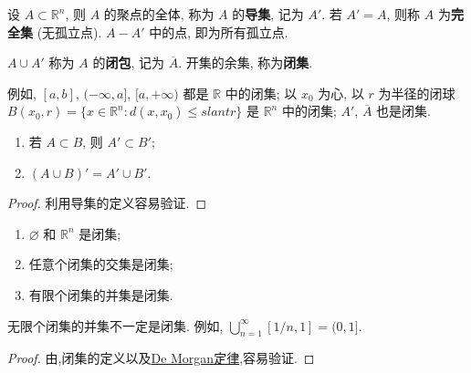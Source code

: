 \documentclass[../../main.tex]{subfiles}
\begin{document}
\begin{definition}
设 $A \subset \mathbb{R}^n$, 则 $A$ 的聚点的全体, 称为 $A$ 的\textbf{导集}, 记为 $A'$. 若 $A' = A$, 则称 $A$ 为\textbf{完全集} (无孤立点).
$A - A'$ 中的点, 即为所有孤立点.

$A \cup A'$ 称为 $A$ 的\textbf{闭包}, 记为 $\overline{A}$.
开集的余集, 称为\textbf{闭集}.
\end{definition}
\begin{note}
例如, $[a, b]$, $(-\infty, a]$, $[a, +\infty)$ 都是 $\mathbb{R}$ 中的闭集; 以 $x_0$ 为心, 以 $r$ 为半径的闭球 $B(x_0, r) = \{x \in \mathbb{R}^n : d(x, x_0) \leqslant slant r\}$ 是 $\mathbb{R}^n$ 中的闭集; $A'$, $\overline{A}$ 也是闭集.
\end{note}

\begin{proposition}
\begin{enumerate}[(1)]
\item 若 $A \subset B$, 则 $A' \subset B'$;
\item $(A \cup B)' = A' \cup B'$.
\end{enumerate}
\end{proposition}
\begin{proof}
利用导集的定义容易验证.
\end{proof}

\begin{proposition}[闭集的性质]\label{proposition:闭集的性质}
\begin{enumerate}[(1)]
\item $\varnothing$ 和 $\mathbb{R}^n$ 是闭集;
\item 任意个闭集的交集是闭集;
\item 有限个闭集的并集是闭集.
\end{enumerate}
\end{proposition}
\begin{remark}
无限个闭集的并集不一定是闭集. 例如, $\bigcup_{n = 1}^{\infty} [1/n, 1] = (0, 1]$.
\end{remark}
\begin{proof}
由,闭集的定义以及\hyperref[Set Theory-theorem:De Morgan定律]{De Morgan定律},容易验证.
\end{proof}
\end{document}
